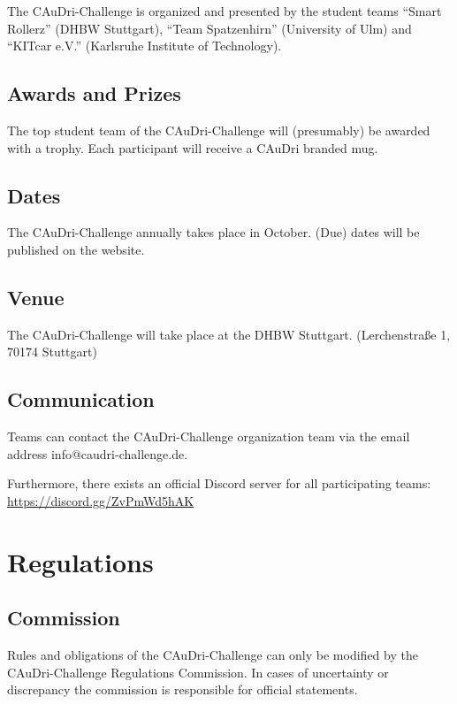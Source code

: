 \documentclass[a4paper]{report}
\begin{document}
The CAuDri-Challenge is organized and presented by the student teams “Smart
Rollerz” (DHBW Stuttgart), “Team Spatzenhirn” (University of Ulm) and “KITcar
e.V.” (Karlsruhe Institute of Technology).

\section{Awards and Prizes}

The top student team of the CAuDri-Challenge will (presumably) be awarded with
a trophy. Each participant will receive a CAuDri branded mug.

\section{Dates}

The CAuDri-Challenge annually takes place in October. (Due) dates will be
published on the website.

\section{Venue}

The CAuDri-Challenge will take place at the DHBW Stuttgart. (Lerchenstraße 1,
70174 Stuttgart)

\section{Communication}

Teams can contact the CAuDri-Challenge organization team via the email address
info@caudri-challenge.de.

Furthermore, there exists an official Discord server for all participating
teams:\\ \href{https://discord.gg/ZvPmWd5hAK}{https://discord.gg/ZvPmWd5hAK}

\chapter{Regulations}

\section{Commission}

Rules and obligations of the CAuDri-Challenge can only be modified by the
CAuDri-Challenge Regulations Commission. In cases of uncertainty or discrepancy
the commission is responsible for official statements.
\end{document}
